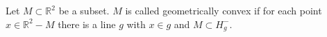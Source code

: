 Let $M \subset \mathbb{R}^2$ be a subset. $M$ is called geometrically convex if for each point $x \in \mathbb{R}^2 - M$ there is a line $g$ with $x \in g$ and $M \subset H_g^-$.

